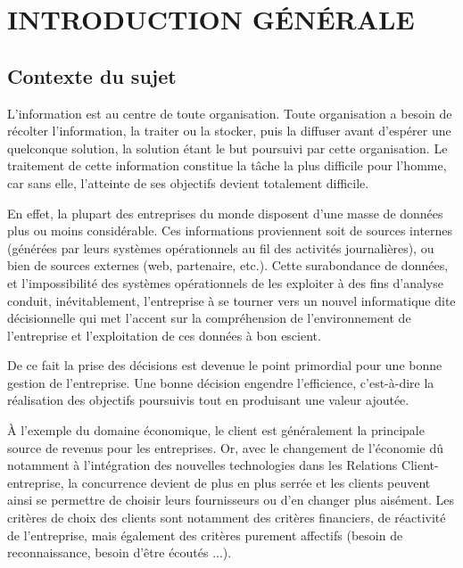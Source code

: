 \chapter*{INTRODUCTION GÉNÉRALE}
    \section[Contexte du sujet]{Contexte du sujet}
    L’information est au centre de toute organisation. Toute organisation a besoin
    de récolter l’information, la traiter ou la stocker, puis la diffuser avant d’espérer une
    quelconque solution, la solution étant le but poursuivi par cette organisation. Le
    traitement de cette information constitue la tâche la plus difficile pour l’homme, car sans
    elle, l’atteinte de ses objectifs devient totalement difficile. 
    \par
    En effet, la plupart des entreprises du monde disposent d’une masse de données plus ou
    moins considérable. Ces informations proviennent soit de sources internes (générées par
    leurs systèmes opérationnels au fil des activités journalières), ou bien de sources externes
    (web, partenaire, etc.). Cette surabondance de données, et l’impossibilité des systèmes
    opérationnels de les exploiter à des fins d’analyse conduit, inévitablement, l’entreprise à se
    tourner vers un nouvel informatique dite décisionnelle qui met l’accent sur la
    compréhension de l’environnement de l’entreprise et l’exploitation de ces données à bon
    escient.
    \par
    De ce fait la prise des décisions est devenue
    le point primordial pour une bonne gestion de
    l’entreprise. Une bonne décision engendre l’efficience,
    c’est-à-dire la réalisation des objectifs
    poursuivis tout en produisant une valeur ajoutée.
    \par
    À l’exemple du domaine
    économique, 
    le client est généralement la principale source de 
    revenus pour les entreprises. 
    Or, avec le changement de l’économie dû notamment
    à l’intégration des nouvelles technologies
    dans les Relations Client-entreprise, la concurrence
    devient de plus en plus serrée et les
    clients peuvent ainsi se permettre de choisir
    leurs fournisseurs ou d’en changer plus aisément.
    Les critères de choix des clients sont notamment des
    critères financiers, de réactivité de l’entreprise, mais
    également des critères purement affectifs
    (besoin de reconnaissance, besoin d’être écoutés ...).
    
